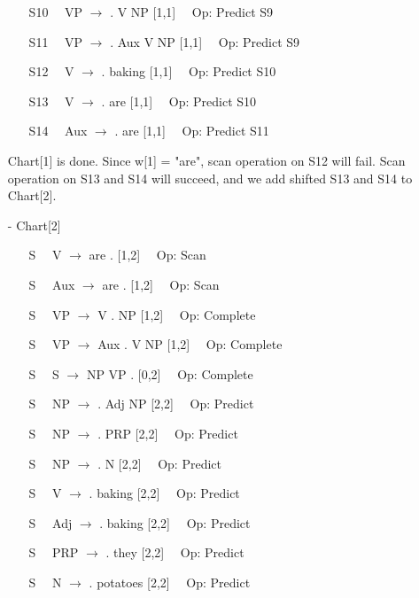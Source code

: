 \documentclass[twoside]{homework}
\begin{document}
\begin{itemize}
\begin{itemize}
        \item [S10] $\text{ }$ VP $\xrightarrow{}$ . V NP [1,1] $\text{ }$ Op: Predict S9
        \item [S11] $\text{ }$ VP $\xrightarrow{}$ . Aux V NP [1,1] $\text{ }$ Op: Predict S9
        \item [S12] $\text{ }$ V $\xrightarrow{}$ . baking [1,1] $\text{ }$ Op: Predict S10
        \item [S13] $\text{ }$ V $\xrightarrow{}$ . are [1,1] $\text{ }$ Op: Predict S10
        \item [S14] $\text{ }$ Aux $\xrightarrow{}$ . are [1,1] $\text{ }$ Op: Predict S11
    \end{itemize}
    Chart[1] is done. Since w[1] = "are", scan operation on S12 will fail. Scan operation on S13 and S14 will succeed, and we add shifted S13 and S14 to Chart[2].\newline\newline
    \item [-] Chart[2]
    \begin{itemize}
        \item [S] $\text{ }$ V $\xrightarrow{}$ are . [1,2] $\text{ }$ Op: Scan
        \item [S] $\text{ }$ Aux $\xrightarrow{}$ are . [1,2] $\text{ }$ Op: Scan
        \item [S] $\text{ }$ VP $\xrightarrow{}$ V . NP [1,2] $\text{ }$ Op: Complete
        \item [S] $\text{ }$ VP $\xrightarrow{}$ Aux . V NP [1,2] $\text{ }$ Op: Complete
        \item [S] $\text{ }$ S $\xrightarrow{}$ NP VP . [0,2] $\text{ }$ Op: Complete
        \item [S] $\text{ }$ NP $\xrightarrow{}$ . Adj NP [2,2] $\text{ }$ Op: Predict
        \item [S] $\text{ }$ NP $\xrightarrow{}$ . PRP [2,2] $\text{ }$ Op: Predict
        \item [S] $\text{ }$ NP $\xrightarrow{}$ . N [2,2] $\text{ }$ Op: Predict
        \item [S] $\text{ }$ V $\xrightarrow{}$ . baking [2,2] $\text{ }$ Op: Predict
        \item [S] $\text{ }$ Adj $\xrightarrow{}$ . baking [2,2] $\text{ }$ Op: Predict
        \item [S] $\text{ }$ PRP $\xrightarrow{}$ . they [2,2] $\text{ }$ Op: Predict
        \item [S] $\text{ }$ N $\xrightarrow{}$ . potatoes [2,2] $\text{ }$ Op: Predict

\end{itemize}
\end{itemize}
\end{document}
